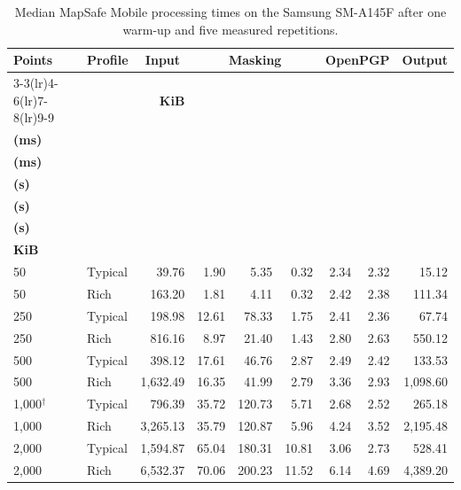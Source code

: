 \documentclass[a4paper,UKenglish,cleveref,autoref,thm-restate]{lipics-v2021}
\begin{document}
\begin{table}[t]
\centering
\caption{Median MapSafe Mobile processing times on the Samsung SM-A145F after one warm-up and five measured repetitions.}
\label{tab:performance-results}
\small
\setlength{\tabcolsep}{2pt}
\begin{tabular*}{\textwidth}{@{\extracolsep{\fill}}llrrrrrrr@{}}
\toprule
\textbf{Points} & \textbf{Profile} & \multicolumn{1}{c}{\textbf{Input}} & \multicolumn{3}{c}{\textbf{Masking}} & \multicolumn{2}{c}{\textbf{OpenPGP}} & \multicolumn{1}{c}{\textbf{Output}} \\
\cmidrule(lr){3-3}\cmidrule(lr){4-6}\cmidrule(lr){7-8}\cmidrule(lr){9-9}
& & \textbf{KiB} & \begin{tabular}[c]{@{}c@{}}\textbf{Core}\\\textbf{(ms)}\end{tabular} & \begin{tabular}[c]{@{}c@{}}\textbf{Core+SM}\\\textbf{(ms)}\end{tabular} & \begin{tabular}[c]{@{}c@{}}\textbf{Complete}\\\textbf{(s)}\end{tabular} & \begin{tabular}[c]{@{}c@{}}\textbf{Encrypt}\\\textbf{(s)}\end{tabular} & \begin{tabular}[c]{@{}c@{}}\textbf{Decrypt}\\\textbf{(s)}\end{tabular} & \begin{tabular}[c]{@{}c@{}}\textbf{PGP}\\\textbf{KiB}\end{tabular} \\
\midrule
50    & Typical & 39.76    & 1.90 & 5.35 & 0.32 & 2.34 & 2.32 & 15.12 \\
50    & Rich    & 163.20   & 1.81 & 4.11 & 0.32 & 2.42 & 2.38 & 111.34 \\
250   & Typical & 198.98   & 12.61 & 78.33 & 1.75 & 2.41 & 2.36 & 67.74 \\
250   & Rich    & 816.16   & 8.97 & 21.40 & 1.43 & 2.80 & 2.63 & 550.12 \\
500   & Typical & 398.12   & 17.61 & 46.76 & 2.87 & 2.49 & 2.42 & 133.53 \\
500   & Rich    & 1,632.49 & 16.35 & 41.99 & 2.79 & 3.36 & 2.93 & 1,098.60 \\
1,000$^{\dagger}$ & Typical & 796.39   & 35.72 & 120.73 & 5.71 & 2.68 & 2.52 & 265.18 \\
1,000 & Rich    & 3,265.13 & 35.79 & 120.87 & 5.96 & 4.24 & 3.52 & 2,195.48 \\
2,000 & Typical & 1,594.87 & 65.04 & 180.31 & 10.81 & 3.06 & 2.73 & 528.41 \\
2,000 & Rich    & 6,532.37 & 70.06 & 200.23 & 11.52 & 6.14 & 4.69 & 4,389.20 \\
\bottomrule
\end{tabular*}
\end{table}
\end{document}
